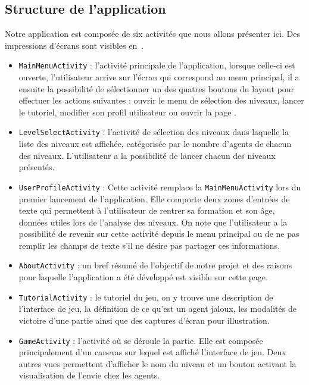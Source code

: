\documentclass[../main.tex]{subfiles}
\begin{document}
	\subsection{Structure de l'application}
	\label{sec-struct}
Notre application est composée de six activités que nous allons présenter ici. Des impressions d'écrans sont visibles en~.
\hfill \break
\begin{itemize}
 \item \texttt{MainMenuActivity} : l'activité principale de l'application, lorsque celle-ci est ouverte, l'utilisateur arrive sur l'écran qui correspond au menu principal, il a ensuite la possibilité de sélectionner un des quatres boutons du layout pour effectuer les actions suivantes : ouvrir le menu de sélection des niveaux, lancer le tutoriel, modifier son profil utilisateur ou ouvrir la page .
 \item \texttt{LevelSelectActivity} : l'activité de sélection des niveaux dans laquelle la liste des niveaux est affichée, catégorisée par le nombre d'agents de chacun des niveaux. L'utilisateur a la possibilité de lancer chacun des niveaux présentés.
 \item \texttt{UserProfileActivity} : Cette activité remplace la \texttt{MainMenuActivity} lors du premier lancement de l'application. Elle comporte deux zones d'entrées de texte qui permettent à l'utilisateur de rentrer sa formation et son âge, données utiles lors de l'analyse des niveaux. On note que l'utilisateur a la possibilité de revenir sur cette activité depuis le menu principal ou de ne pas remplir les champs de texte s'il ne désire pas partager ces informations. 
 \item\texttt{AboutActivity} : un bref résumé de l'objectif de notre projet et des raisons pour laquelle l'application a été développé est visible sur cette page.
 \item\texttt{TutorialActivity} : le tutoriel du jeu, on y trouve une description de l'interface de jeu, la définition de ce qu'est un agent jaloux, les modalités de victoire d'une partie ainsi que des captures d'écran pour illustration.
 \item \texttt{GameActivity} : l'activité où se déroule la partie. Elle est composée principalement d'un canevas sur lequel est affiché l'interface de jeu. Deux autres vues permettent d'afficher le nom du niveau et un bouton activant la visualisation de l'envie chez les agents.
 \end{itemize}  
 
\end{document}
